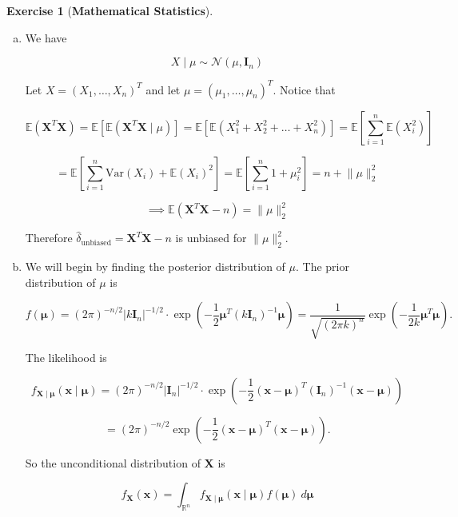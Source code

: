 \documentclass{article}
\theoremstyle{definition}
\newtheorem{exercise}{Exercise}
\theoremstyle{definition}
\theoremstyle{definition}
\theoremstyle{definition}
\theoremstyle{definition}
\newcommand{\E}{\mathbb{E}}
\newcommand{\Var}{\mathrm{Var}}
\begin{document}
\begin{exercise}[\textbf{Mathematical Statistics}]

\begin{enumerate}[(a)]

\item We have

\[
X \mid \mu \sim \mathcal{N}(\mu, \boldsymbol{I}_n)
\]

Let \(X = (X_1, \ldots, X_n)^T\) and let \(\mu = (\mu_1, \ldots, \mu_n)^T\). Notice that

\[
\E(\boldsymbol{X}^T\boldsymbol{X}) = \E[ \E(\boldsymbol{X}^T\boldsymbol{X} \mid \mu)] =  \E \left[ \E \left( X_1^2 + X_2^2 + \ldots + X_n^2 \right)  \right] = \E \left[ \sum_{i=1}^n \E (X_i^2)  \right] 
\]

\[
= \E \left[ \sum_{i=1}^n \Var(X_i) + \E(X_i)^2  \right]  =  \E \left[ \sum_{i=1}^n 1+ \mu_i^2 \right] = n + \lVert \mu \rVert_2^2 
\]

\[
\implies \E(\boldsymbol{X}^T\boldsymbol{X} - n) =  \lVert \mu \rVert_2^2 
\]

Therefore \(\boxed{ \hat{\delta}_{\text{unbiased}} = \boldsymbol{X}^T\boldsymbol{X} - n}\) is unbiased for \(\lVert \mu \rVert_2^2\).

\item We will begin by finding the posterior distribution of \(\mu\). The prior distribution of \(\mu\) is

\[
f(\boldsymbol{\mu}) = (2 \pi)^{-n/2} | k\boldsymbol{I}_n|^{-1/2} \cdot \exp \left(- \frac{1}{2} \boldsymbol{\mu} ^T ( k\boldsymbol{I}_n)^{-1} \boldsymbol{\mu} \right) = \frac{1}{\sqrt{(2 \pi k)^n}} \exp \left(- \frac{1}{2k}\boldsymbol{\mu} ^T  \boldsymbol{\mu} \right).
\]


The likelihood is

\[
f_{\boldsymbol{X} \mid \boldsymbol{\mu}}(\boldsymbol{x} \mid \boldsymbol{\mu}) = (2 \pi)^{-n/2} | \boldsymbol{I}_n|^{-1/2} \cdot \exp \left(- \frac{1}{2}(\boldsymbol{x} - \boldsymbol{\mu}) ^T ( \boldsymbol{I}_n)^{-1} (\boldsymbol{x} - \boldsymbol{\mu} ) \right)
\]

\[
= (2 \pi)^{-n/2} \exp \left(- \frac{1}{2}(\boldsymbol{x} - \boldsymbol{\mu}) ^T  (\boldsymbol{x} - \boldsymbol{\mu} ) \right).
\]

So the unconditional distribution of \(\boldsymbol{X}\) is

\[
f_{\boldsymbol{X}}(\boldsymbol{x})  = \int_{\mathbb{R}^n} f_{\boldsymbol{X} \mid \boldsymbol{\mu}}(\boldsymbol{x} \mid \boldsymbol{\mu}) f(\boldsymbol{\mu}) \ d \boldsymbol{\mu} 
\]


\end{enumerate}
\end{exercise}
\end{document}
